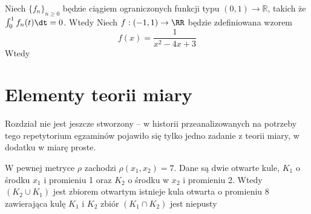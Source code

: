 \begin{problems}
    \prob Niech $\{f_n\}_{n \geq 0}$ będzie ciągiem ograniczonych funkcji typu $(0, 1) \to \mathbb{R}$, takich że $\int_0^1{f_n(t) \dt} = 0$. Wtedy
    \prob Niech $f : (-1, 1) \to \RR$ będzie zdefiniowana wzorem
    $$f(x) = \frac{1}{x^2 - 4x + 3}$$
    Wtedy
\end{problems}

\section{Elementy teorii miary}

\begin{editorsnote}
    Rozdział nie jest jeszcze stworzony -- w historii przeanalizowanych na potrzeby tego repetytorium egzaminów pojawiło się tylko jedno zadanie z teorii miary, w dodatku w miarę proste.
\end{editorsnote}

\begin{problems}
    \prob W pewnej metryce $\rho$ zachodzi $\rho(x_1, x_2) = 7$. Dane są dwie otwarte kule, $K_1$ o środku $x_1$ i promieniu 1 oraz $K_2$ o środku w $x_2$ i promieniu 2. Wtedy
    \answers
    {$(K_2 \cup K_1)$ jest zbiorem otwartym}
    {istnieje kula otwarta o promieniu $8$ zawierająca kulę $K_1$ i $K_2$}
    {zbiór $(K_1 \cap K_2)$ jest niepusty}
\end{problems}

